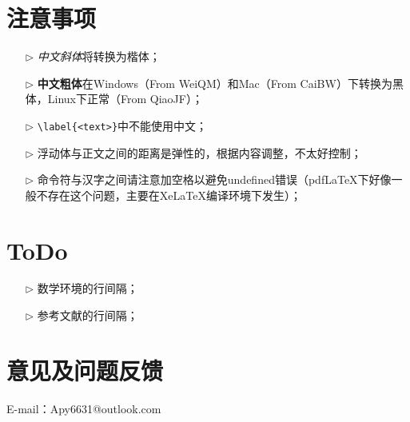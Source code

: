 \section{注意事项}
\begin{itemize}
  \item[$\triangleright$] \textit{中文斜体}将转换为楷体；
  \item[$\triangleright$] \textbf{中文粗体}在Windows（From WeiQM）和Mac（From CaiBW）下转换为黑体，Linux下正常（From QiaoJF）；
  \item[$\triangleright$] \verb|\label{<text>}|中不能使用中文；
  \item[$\triangleright$] 浮动体与正文之间的距离是弹性的，根据内容调整，不太好控制；
  \item[$\triangleright$] 命令符与汉字之间请注意加空格以避免undefined错误（pdfLaTeX下好像一般不存在这个问题，主要在XeLaTeX编译环境下发生）；
\end{itemize}

\section{ToDo}
\begin{itemize}
  \item[$\triangleright$] 数学环境的行间隔；
  \item[$\triangleright$] 参考文献的行间隔；
\end{itemize}

\section{意见及问题反馈}

\indent E-mail：Apy6631@outlook.com \\
